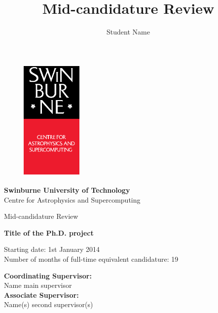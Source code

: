 \documentclass[useAMS,usenatbib,onecolumn]{mnras}
\title{Mid-candidature Review}
\author[Student Name]
 {Student Name}
\begin{document}
\fontsize{11}{12.5}\selectfont
\begin{center}

\begin{figure}
\begin{center}
\includegraphics[height=6cm,width=3cm]{./astro_v.eps}
\end{center}
\end{figure}

{\bf \LARGE S\Large winburne \LARGE U\Large niversity of  \LARGE T\Large echnology\\
\vspace{0.5cm}}
\LARGE C\Large entre for \LARGE A\Large strophysics and \LARGE S\Large upercomputing\\
\vspace{0.5cm}

\large Mid-candidature Review\\
\vspace{0.5cm}



\Huge{\bf Title of the Ph.D. project}

\vspace{3cm}
\large{Starting date: 1st January 2014\\}
\vspace{0.2cm}
\large{Number of months of full-time equivalent candidature: 19}
\vspace{0.5cm}
\end{center}


\begin{flushleft}
{\bf Coordinating Supervisor:}\\
Name main supervisor\\
\vspace{0.5cm}
{\bf Associate Supervisor:}\\
Name(s) second supervisor(s)\\
\end{flushleft}
\end{document}
